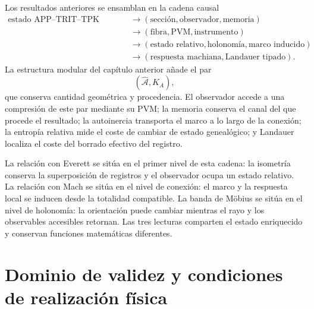 Los resultados anteriores se ensamblan en la cadena causal
\begin{equation}
 \begin{aligned}
 \text{estado APP--TRIT--TPK enriquecido}
 &\longrightarrow
 (\text{secci\'on},\text{observador},\text{memoria})\\
 &\longrightarrow
 (\text{fibra},\text{PVM},\text{instrumento})\\
 &\longrightarrow
 (\text{estado relativo},\text{holonom\'ia},\text{marco inducido})\\
 &\longrightarrow
 (\text{respuesta machiana},\text{Landauer tipado}).
 \end{aligned}
 \label{eq:rm-obs-causal-chain}
\end{equation}
La estructura modular del cap\'itulo anterior a\~nade el par
\begin{equation}
 (\widehat{\mathcal A},K_A),
 \label{eq:rm-obs-area-modular-pair}
\end{equation}
que conserva cantidad geom\'etrica y procedencia. El observador accede a una
compresi\'on de este par mediante su PVM; la memoria conserva el canal del
que procede el resultado; la autoinercia transporta el marco a lo largo de
la conexi\'on; la entrop\'ia relativa mide el coste de cambiar de estado
geneal\'ogico; y Landauer localiza el coste del borrado efectivo del
registro.

La relaci\'on con Everett se sit\'ua en el primer nivel de esta cadena: la
isometr\'ia conserva la superposici\'on de registros y el observador ocupa un
estado relativo. La relaci\'on con Mach se sit\'ua en el nivel de conexi\'on:
el marco y la respuesta local se inducen desde la totalidad compatible. La
banda de M\"obius se sit\'ua en el nivel de holonom\'ia: la orientaci\'on
puede cambiar mientras el rayo y los observables accesibles retornan. Las
tres lecturas comparten el estado enriquecido y conservan funciones
matem\'aticas diferentes.

\section{Dominio de validez y condiciones de realización física}

